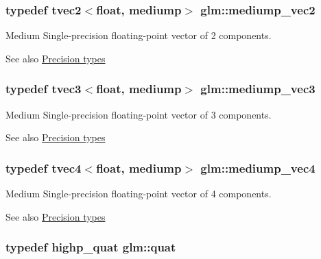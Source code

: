 \subsubsection[{mediump\+\_\+vec2}]{\setlength{\rightskip}{0pt plus 5cm}typedef tvec2$<$float, mediump$>$ {\bf glm\+::mediump\+\_\+vec2}}\label{namespaceglm_af68118a5464fb85765141f62b5894531}
Medium Single-\/precision floating-\/point vector of 2 components. \begin{DoxySeeAlso}{See also}
\hyperlink{group__core__precision}{Precision types} 
\end{DoxySeeAlso}
\hypertarget{namespaceglm_a728b91412ec763dbb53bb6545506da7c}{}
\subsubsection[{mediump\+\_\+vec3}]{\setlength{\rightskip}{0pt plus 5cm}typedef tvec3$<$float, mediump$>$ {\bf glm\+::mediump\+\_\+vec3}}\label{namespaceglm_a728b91412ec763dbb53bb6545506da7c}
Medium Single-\/precision floating-\/point vector of 3 components. \begin{DoxySeeAlso}{See also}
\hyperlink{group__core__precision}{Precision types} 
\end{DoxySeeAlso}
\hypertarget{namespaceglm_aef62daee3ded964134c0f959102182e8}{}
\subsubsection[{mediump\+\_\+vec4}]{\setlength{\rightskip}{0pt plus 5cm}typedef tvec4$<$float, mediump$>$ {\bf glm\+::mediump\+\_\+vec4}}\label{namespaceglm_aef62daee3ded964134c0f959102182e8}
Medium Single-\/precision floating-\/point vector of 4 components. \begin{DoxySeeAlso}{See also}
\hyperlink{group__core__precision}{Precision types} 
\end{DoxySeeAlso}
\hypertarget{namespaceglm_ac1f6a5957091b849730ea6f05a6b7ad6}{}
\subsubsection[{quat}]{\setlength{\rightskip}{0pt plus 5cm}typedef {\bf highp\+\_\+quat} {\bf glm\+::quat}}\label{namespaceglm_ac1f6a5957091b849730ea6f05a6b7ad6}


